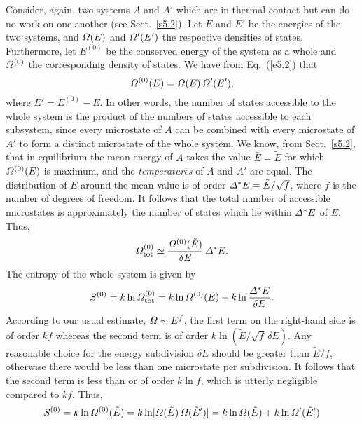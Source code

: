 Consider, again, two systems $A$ and $A'$ which are in thermal contact but can do
no work on one another (see Sect.~\ref{s5.2}). 
Let $E$ and $E'$ be the energies of the two systems, 
and ${\mit\Omega}(E)$ and ${\mit\Omega}'(E')$ the respective densities of states. 
Furthermore, let $E^{(0)}$
be the conserved energy of the
system as a whole and ${\mit\Omega}^{(0)}$ the corresponding density of states.
 We have from Eq.~(\ref{e5.2}) that
\begin{equation}
{\mit\Omega}^{(0)}(E) = {\mit\Omega}(E) \,{\mit\Omega}'(E'),
\end{equation}
where $E' = E^{(0)}-E$. In other words, the number of states accessible to the
whole system is the product of the numbers of states accessible to each subsystem,
since every microstate of $A$ can be combined with every microstate of
$A'$ to form a distinct microstate of the whole system. We know, from Sect.~\ref{s5.2},
that in equilibrium the mean energy of $A$ takes the value $\bar{E}=
\tilde{E}$ for which ${\mit\Omega}^{(0)}(E)$ is maximum, and the
{\em temperatures}\/ of $A$ and $A'$ are equal. The distribution of $E$ around the
mean value is of order ${\mit\Delta}^\ast
 E = \tilde{E}/\sqrt{f}$, where $f$ is the number of
degrees of freedom. It follows that the total number of accessible microstates is
approximately the number of states which lie within ${\mit\Delta}^\ast E$ of $\tilde{E}$. 
Thus,
\begin{equation}
{\mit\Omega}^{(0)}_{\rm tot} \simeq \frac{{\mit\Omega}^{(0)}(\tilde{E})}
{\delta E}\, {\mit\Delta}^\ast E.
\end{equation}
The entropy of the whole system is given by
\begin{equation}
S^{(0)} = k \ln {\mit\Omega}^{(0)}_{\rm tot} = k\ln{\mit\Omega}^{(0)}(\tilde{E})+
k\ln \frac{{\mit\Delta}^\ast E}{\delta E}.
\end{equation}
According to our usual estimate, ${\mit\Omega}\sim E^f$, the first term on the
 right-hand
 side is of order $kf$ whereas the second term is of order $k\ln(\tilde{E}/\sqrt{f}
\,\delta E)$. Any reasonable choice for the energy subdivision $\delta E$ should be 
greater than $\tilde{E}/f$, otherwise there would
 be less than one microstate per subdivision. It follows that the second term
is less than or of order $k\ln f$, which is utterly negligible compared to
$kf$. Thus,
\begin{equation}
S^{(0)} = k\ln{\mit\Omega}^{(0)}(\tilde{E}) = k\ln[{\mit\Omega}(\tilde{E})\,
{\mit\Omega}(\tilde{E}')]
=k\ln {\mit\Omega}(\tilde{E}) + k\ln {\mit\Omega}'(\tilde{E}')
\end{equation}
